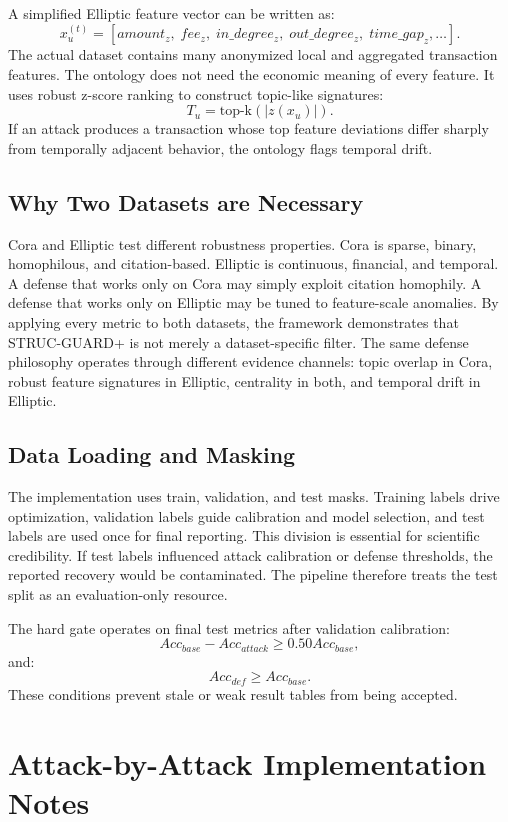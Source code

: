 \documentclass[12pt,oneside]{report}
\begin{document}
A simplified Elliptic feature vector can be written as:
$$
x_u^{(t)}=[amount_z,\;fee_z,\;in\_degree_z,\;out\_degree_z,\;time\_gap_z,\ldots].
$$
The actual dataset contains many anonymized local and aggregated transaction features. The ontology does not need the economic meaning of every feature. It uses robust z-score ranking to construct topic-like signatures:
$$
T_u=\text{top-k}\left(|z(x_u)|\right).
$$
If an attack produces a transaction whose top feature deviations differ sharply from temporally adjacent behavior, the ontology flags temporal drift.

\section{Why Two Datasets are Necessary}
Cora and Elliptic test different robustness properties. Cora is sparse, binary, homophilous, and citation-based. Elliptic is continuous, financial, and temporal. A defense that works only on Cora may simply exploit citation homophily. A defense that works only on Elliptic may be tuned to feature-scale anomalies. By applying every metric to both datasets, the framework demonstrates that STRUC-GUARD+ is not merely a dataset-specific filter. The same defense philosophy operates through different evidence channels: topic overlap in Cora, robust feature signatures in Elliptic, centrality in both, and temporal drift in Elliptic.

\section{Data Loading and Masking}
The implementation uses train, validation, and test masks. Training labels drive optimization, validation labels guide calibration and model selection, and test labels are used once for final reporting. This division is essential for scientific credibility. If test labels influenced attack calibration or defense thresholds, the reported recovery would be contaminated. The pipeline therefore treats the test split as an evaluation-only resource.

The hard gate operates on final test metrics after validation calibration:
$$
Acc_{base}-Acc_{attack}\geq 0.50Acc_{base},
$$
and:
$$
Acc_{def}\geq Acc_{base}.
$$
These conditions prevent stale or weak result tables from being accepted.

\chapter{Attack-by-Attack Implementation Notes}
\end{document}
